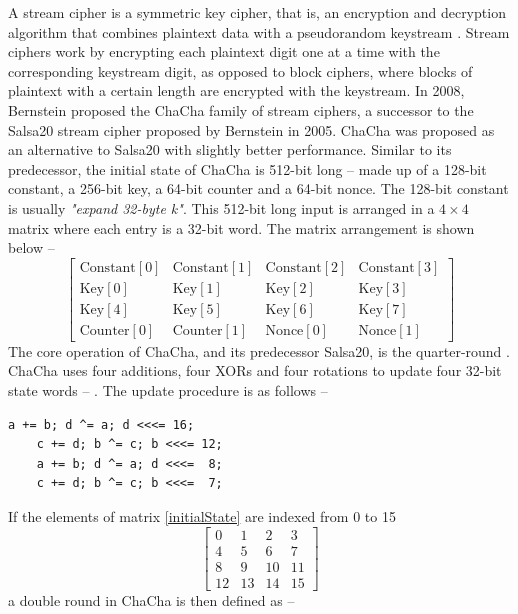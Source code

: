 \documentclass[a4paper]{cas-sc}
\begin{document}
A stream cipher is a symmetric key cipher, that is, an encryption and decryption algorithm that combines plaintext data with a pseudorandom keystream \cite{robshaw1995stream}. Stream ciphers work by encrypting each plaintext digit one at a time with the corresponding keystream digit, as opposed to block ciphers, where blocks of plaintext with a certain length are encrypted with the keystream. In 2008, Bernstein proposed the ChaCha family of stream ciphers, a successor to the Salsa20 stream cipher \cite{bernstein2005salsa20} proposed by Bernstein in 2005. ChaCha was proposed as an alternative to Salsa20 \cite{bernstein2008chachaFamily} with slightly better performance. Similar to its predecessor, the initial state of ChaCha is 512-bit long -- made up of a 128-bit constant, a 256-bit key, a 64-bit counter and a 64-bit nonce. The 128-bit constant is usually \textit{"expand 32-byte k"}. This 512-bit long input is arranged in a $4\times4$ matrix where each entry is a 32-bit word. The matrix arrangement is shown below --
\begin{equation}\label{initialState}
    \left[
        \begin{array}{cccc}
            \text{Constant}[0] & \text{Constant}[1] & \text{Constant}[2] & \text{Constant}[3] \\
            \text{Key}[0]      & \text{Key}[1]      & \text{Key}[2]      & \text{Key}[3]      \\
            \text{Key}[4]      & \text{Key}[5]      & \text{Key}[6]      & \text{Key}[7]      \\
            \text{Counter}[0]  & \text{Counter}[1]  & \text{Nonce}[0]    & \text{Nonce}[1]
        \end{array}
        \right]
\end{equation}
The core operation of ChaCha, and its predecessor Salsa20, is the quarter-round . ChaCha uses four additions, four XORs and four rotations to update four 32-bit state words -- . The update procedure is as follows --

\begin{lstlisting}[basicstyle=\ttfamily,frame=none]
    a += b; d ^= a; d <<<= 16;
    c += d; b ^= c; b <<<= 12;
    a += b; d ^= a; d <<<=  8;
    c += d; b ^= c; b <<<=  7;
\end{lstlisting}

\noindent If the elements of matrix \ref{initialState} are indexed from 0 to 15
\[\left[
        \begin{array}{cccc}
            0  & 1  & 2  & 3  \\
            4  & 5  & 6  & 7  \\
            8  & 9  & 10 & 11 \\
            12 & 13 & 14 & 15
        \end{array}
        \right]\]
a double round in ChaCha is then defined as --
\end{document}
